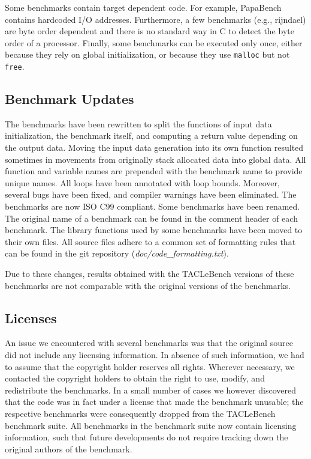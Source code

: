 \documentclass[a4paper,UKenglish]{oasics}
\newcommand{\todo}[1]{{\emph{TODO: #1}}}
\newcommand{\martin}[1]{{\color{blue} Martin: #1}}
\newcommand{\code}[1]{{\small{\texttt{#1}}}}
\renewcommand{\todo}[1]{}
\renewcommand{\martin}[1]{}
\begin{document}
\martin{Mmh, I think we need to fix this. The simplest form is dropping them
from the list. How many benchmarks depend on byte ordering?}
Some benchmarks contain target dependent code.
For example, PapaBench contains hardcoded I/O addresses.
Furthermore, a few benchmarks (e.g., rijndael) are byte order dependent
and there is no standard way in C to detect the byte order of a processor.
Finally, some benchmarks can be executed only once, either because
they rely on global initialization, or because they use \code{malloc} but not \code{free}.


\subsection{Benchmark Updates}

The benchmarks have been rewritten to split the functions of
input data initialization, the benchmark itself, and computing a return
value depending on the output data. Moving the input data generation
into its own function resulted sometimes in movements from originally
stack allocated data into global data.
All function and variable names are prepended with the benchmark
name to provide unique names.
All loops have been annotated with loop bounds.
Moreover, several bugs have been fixed, and compiler warnings have been eliminated.
The benchmarks are now ISO C99 compliant.
Some benchmarks have been renamed. The original name of a benchmark can be found in the comment header of each benchmark.
The library functions used by some benchmarks have been moved to their own files.
All source files adhere to a common set of formatting rules that can be found in the git repository (\textit{doc/code\_formatting.txt}).


Due to these changes, results obtained with the TACLeBench versions
of these benchmarks are not comparable with the original versions of
the benchmarks.


\subsection{Licenses}

An issue we encountered with several benchmarks was that the original
source did not include any licensing information. In absence of such
information, we had to assume that the copyright holder reserves all
rights. Wherever necessary, we contacted the copyright holders to
obtain the right to use, modify, and redistribute the benchmarks. In a
small number of cases we however discovered that the code was in fact
under a license that made the benchmark unusable; the respective
benchmarks were consequently dropped from the TACLeBench benchmark
suite. All benchmarks in the benchmark suite now contain licensing
information, such that future developments do not require tracking
down the original authors of the benchmark.
\end{document}
